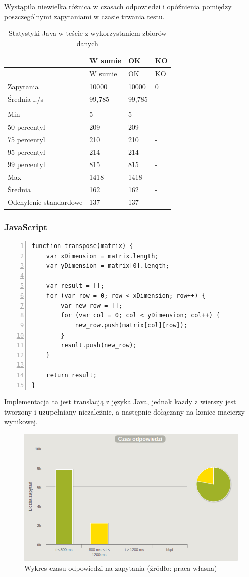 \documentclass[12pt,twoside]{article}
\begin{document}
Wystąpiła niewielka różnica w czasach odpowiedzi i opóźnienia pomiędzy
poszczególnymi zapytaniami w czasie trwania testu.

\begin{longtable}[c]{@{}llll@{}}
\caption{Statystyki Java w teście z wykorzystaniem zbiorów
danych}\tabularnewline
\toprule
& W sumie & OK & KO\tabularnewline
\midrule
\endfirsthead
\toprule
& W sumie & OK & KO\tabularnewline
\midrule
\endhead
Zapytania & 10000 & 10000 & 0\tabularnewline
Średnia l./s & 99,785 & 99,785 & -\tabularnewline
& & &\tabularnewline
Min & 5 & 5 & -\tabularnewline
50 percentyl & 209 & 209 & -\tabularnewline
75 percentyl & 210 & 210 & -\tabularnewline
95 percentyl & 214 & 214 & -\tabularnewline
99 percentyl & 815 & 815 & -\tabularnewline
Max & 1418 & 1418 & -\tabularnewline
Średnia & 162 & 162 & -\tabularnewline
Odchylenie standardowe & 137 & 137 & -\tabularnewline
\bottomrule
\end{longtable}

\clearpage

\subsubsection{JavaScript}\label{javascript-2}

\begin{lstlisting}[numbers=left, caption=JavaScript - transpozycja macierzy]
function transpose(matrix) {
    var xDimension = matrix.length;
    var yDimension = matrix[0].length;

    var result = [];
    for (var row = 0; row < xDimension; row++) {
        var new_row = [];
        for (var col = 0; col < yDimension; col++) {
            new_row.push(matrix[col][row]);
        }
        result.push(new_row);
    }

    return result;
}
\end{lstlisting}

Implementacja ta jest translacją z języka Java, jednak każdy z wierszy
jest tworzony i uzupełniany niezależnie, a następnie dołączany na koniec
macierzy wynikowej.

\begin{figure}[htbp]
\centering
\includegraphics[resolution=150]{test_results/js/matrix/screenshots/response_times.png}
\caption{Wykres czasu odpowiedzi na zapytania (źródło: praca własna)}
\end{figure}
\end{document}
